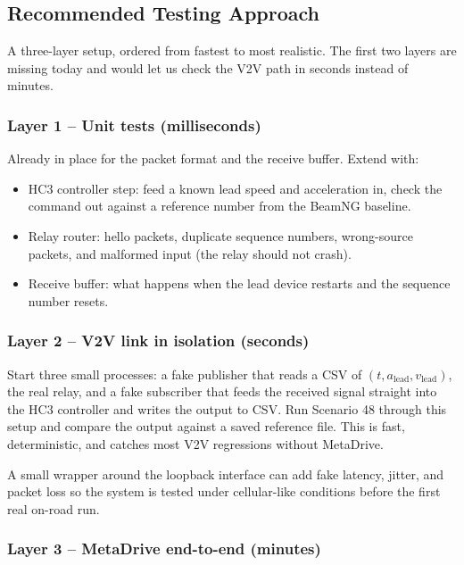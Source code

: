 \documentclass[12pt]{article}
\begin{document}
\subsection{Recommended Testing Approach}

A three-layer setup, ordered from fastest to most realistic. The first two layers are missing today and would let us check the V2V path in seconds instead of minutes.

\subsubsection*{Layer 1 -- Unit tests (milliseconds)}

Already in place for the packet format and the receive buffer. Extend with:

\begin{itemize}
  \item HC3 controller step: feed a known lead speed and acceleration in, check the command out against a reference number from the BeamNG baseline.
  \item Relay router: hello packets, duplicate sequence numbers, wrong-source packets, and malformed input (the relay should not crash).
  \item Receive buffer: what happens when the lead device restarts and the sequence number resets.
\end{itemize}

\subsubsection*{Layer 2 -- V2V link in isolation (seconds)}

Start three small processes: a fake publisher that reads a CSV of $(t, a_{\text{lead}}, v_{\text{lead}})$, the real relay, and a fake subscriber that feeds the received signal straight into the HC3 controller and writes the output to CSV. Run Scenario 48 through this setup and compare the output against a saved reference file. This is fast, deterministic, and catches most V2V regressions without MetaDrive.

A small wrapper around the loopback interface can add fake latency, jitter, and packet loss so the system is tested under cellular-like conditions before the first real on-road run.

\subsubsection*{Layer 3 -- MetaDrive end-to-end (minutes)}
\end{document}
